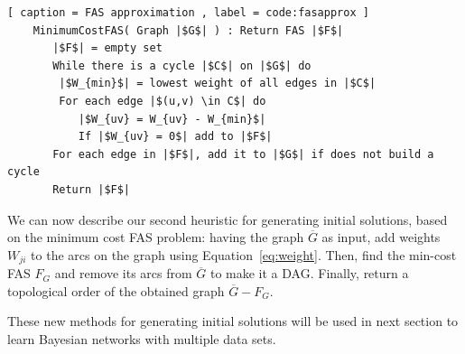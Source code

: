 \begin{lstlisting}[ caption = FAS approximation , label = code:fasapprox ]
	MinimumCostFAS( Graph |$G$| ) : Return FAS |$F$|
	   |$F$| = empty set
	   While there is a cycle |$C$| on |$G$| do
	   	|$W_{min}$| = lowest weight of all edges in |$C$|
		For each edge |$(u,v) \in C$| do
		   |$W_{uv} = W_{uv} - W_{min}$|
		   If |$W_{uv} = 0$| add to |$F$|
	   For each edge in |$F$|, add it to |$G$| if does not build a cycle
	   Return |$F$|
\end{lstlisting}

We can now describe our second heuristic for generating initial solutions, based on the minimum cost FAS problem: having the graph $\overline G$ as input, add weights $W_{ji}$ to the arcs on the graph using Equation~\ref{eq:weight}. Then, find the min-cost FAS $F_G$ and remove its arcs from $\overline G$ to make it a DAG. Finally, return a topological order of the obtained graph $\overline G - F_G$.

These new methods for generating initial solutions will be used in next section to learn Bayesian networks with multiple data sets.